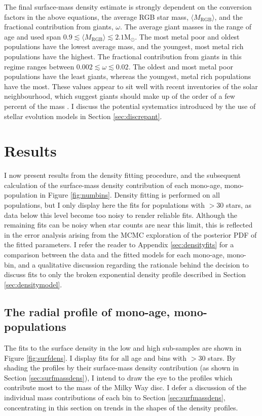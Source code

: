 The final surface-mass density estimate is strongly dependent on the conversion factors in the above equations, the average RGB star mass, $\langle M_{\mathrm{RGB}} \rangle$, and the fractional contribution from giants, $\omega$. The average giant masses in the range of age and \feh{} used span $0.9 \lesssim \langle M_{\mathrm{RGB}} \rangle \lesssim 2.1 \mathrm{M_{\odot}}$. The most metal poor and oldest populations have the lowest average mass, and the youngest, most metal rich populations have the highest. The fractional contribution from giants in this regime ranges between $0.002 \lesssim \omega \lesssim 0.02 $. The oldest and most metal poor populations have the least giants, whereas the youngest, metal rich populations have the most. These values appear to sit well with recent inventories of the solar neighbourhood, which suggest giants should make up of the order of a few percent of the mass \citep{2015ApJ...814...13M}. I discuss the potential systematics introduced by the use of stellar evolution models in Section \ref{sec:discrepant}.


\section{Results}
\label{sec:resultsa}
I now present results from the density fitting procedure, and the subsequent calculation of the surface-mass density contribution of each mono-age, mono-\feh{} population in Figure \ref{fig:numbins}. Density fitting is performed on all populations, but I only display here the fits for populations with $> 30$ stars, as data below this level become too noisy to render reliable fits. Although the remaining fits can be noisy when star counts are near this limit, this is reflected in the error analysis arising from the MCMC exploration of the posterior PDF of the fitted parameters. I refer the reader to Appendix \ref{sec:densityfits} for a comparison between the data and the fitted models for each mono-age, mono-\feh{} bin, and a qualitative discussion regarding the rationale behind the decision to discuss fits to only the broken exponential density profile described in Section \ref{sec:densitymodel}.

\subsection{The radial profile of mono-age, mono-\feh{} populations}
The fits to the surface density in the low and high \afe{} sub-samples are shown in Figure \ref{fig:surfdens}. I display fits for all age and \feh{} bins with $> 30$ stars. By shading the profiles by their surface-mass density contribution (as shown in Section \ref{sec:surfmassdens}), I intend to draw the eye to the profiles which contribute most to the mass of the Milky Way disc. I defer a discussion of the individual mass contributions of each bin to Section \ref{sec:surfmassdens}, concentrating in this section on trends in the shapes of the density profiles. 


